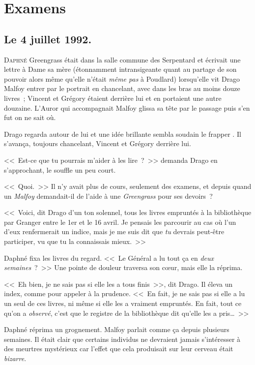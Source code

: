 \chapter{Examens}

\section{Le 4 juillet 1992.}

\lettrine{D}{aphné} Greengrass était dans la salle commune des Serpentard et écrivait une lettre à Dame sa mère (étonnamment intransigeante quant au partage de son pouvoir alors même qu'elle n'était \emph{même pas} à Poudlard) lorsqu'elle vit Drago Malfoy entrer par le portrait en chancelant, avec dans les bras au moins douze livres~; Vincent et Grégory étaient derrière lui et en portaient une autre douzaine. L'Auror qui accompagnait Malfoy glissa sa tête par le passage puis s'en fut on ne sait où.

Drago regarda autour de lui et une idée brillante sembla soudain le frapper . Il s'avança, toujours chancelant, Vincent et Grégory derrière lui.

<<~Est-ce que tu pourrais m'aider à les lire~?~>> demanda Drago en s'approchant, le souffle un peu court.

<<~Quoi.~>> Il n'y avait plus de cours, seulement des examens, et depuis quand un \emph{Malfoy} demandait-il de l'aide à une \emph{Greengrass} pour ses devoirs~?

<<~Voici, dit Drago d'un ton solennel, tous les livres empruntés à la bibliothèque par Granger entre le 1er et le 16 avril. Je pensais les parcourir au cas où l'un d'eux renfermerait un indice, mais je me suis dit que \emph{tu} devrais peut-être participer, vu que tu la connaissais mieux.~>>

Daphné fixa les livres du regard. <<~Le Général a lu tout ça en \emph{deux semaines}~?~>> Une pointe de douleur traversa son cœur, mais elle la réprima.

<<~Eh bien, je ne sais pas si elle les a tous finis~>>, dit Drago. Il éleva un index, comme pour appeler à la prudence. <<~En fait, je ne sais pas si elle a lu un seul de ces livres, ni même si elle les a vraiment empruntés. En fait, tout ce qu'on a \emph{observé}, c'est que le registre de la bibliothèque dit qu'elle les a pris…~>>

Daphné réprima un grognement. Malfoy parlait comme ça depuis plusieurs semaines. Il était clair que certains individus ne devraient jamais s'intéresser à des meurtres mystérieux car l'effet que cela produisait sur leur cerveau était \emph{bizarre}.

